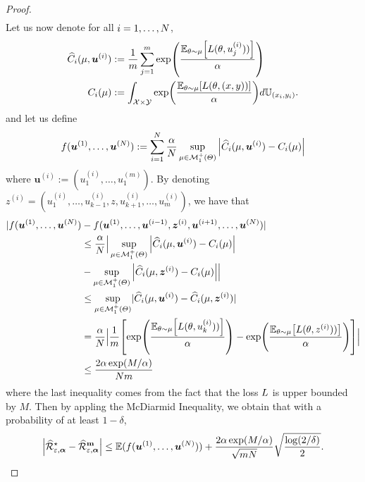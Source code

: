 \begin{proof}
\begin{align*}
\end{align*}
Let us now denote for all $i=1,\dots,N$,
\begin{align*}
    \widehat{C}_i(\mu,\bm{u}^{(i)})&:=\frac1m \sum_{j=1}^{m}\exp\left(\frac{\mathbb{E}_{\theta \sim \mu}\left[\loss(\theta,u_j^{(i)}))\right]}{\alpha}\right)\\
    C_i(\mu)&:= \int_{\mathcal{X}\times\mathcal{Y}}\exp\left(\frac{\mathbb{E}_{\theta \sim \mu}\left[\loss(\theta,(x,y))\right]}{\alpha}\right) d\mathbb{U}_{(x_i,y_i)}.
\end{align*}
and let us define 
\begin{align*}
    f(\bm{u}^{(1)},\dots,\bm{u}^{(N)}):=\sum_{i=1}^N\frac{\alpha}{N}\sup_{\mu\in \mathcal{M}^+_1(\Theta)}\Big |\widehat{C}_i(\mu,\bm{u}^{(i)}) -C_i(\mu)\Big |
\end{align*}
where $\bm{u}^{(i)}:=(u_1^{(i)},\dots,u_1^{(m)})$. By denoting $z^{(i)}=(u_1^{(i)},\dots,u_{k-1}^{(i)},z,u_{k+1}^{(i)},\dots,u_m^{(i)})$, we have that
\begin{align*}
  |f(\bm{u}^{(1)},\dots,\bm{u}^{(\numsamples)})& - f(\bm{u}^{(1)},\dots,\bm{u}^{(i-1)},\bm{z}^{(i)},\bm{u}^{(i+1)},\dots,\bm{u}^{(\numsamples)})|\\
  &\leq \frac{\alpha}{\numsamples}\Big | \sup_{\mu\in \mathcal{M}^+_1(\Theta)}\Big |\widehat{C}_i(\mu,\bm{u}^{(i)}) -C_i(\mu)\Big |\\
 & - \sup_{\mu\in \mathcal{M}^+_1(\Theta)}\Big |\widehat{C}_i(\mu,\bm{z}^{(i)}) -C_i(\mu)\Big | \Big |\\
 &\leq\sup_{\mu\in \mathcal{M}^+_1(\Theta)} \lvert \widehat{C}_i(\mu,\bm{u}^{(i)}) -\widehat{C}_i(\mu,\bm{z}^{(i)}) \rvert\\
  &= \frac{\alpha}{\numsamples}\Big |\frac{1}{m}\left[\exp\left(\frac{\mathbb{E}_{\theta \sim \mu}\left[\loss(\theta,u_k^{(i)}))\right]}{\alpha}\right) - \exp\left(\frac{\mathbb{E}_{\theta \sim \mu}\left[\loss(\theta,z^{(i)}))\right]}{\alpha}\right) \right]\Big| \\
  &\leq \frac{2\alpha\exp(M/\alpha)}{\numsamples m}
\end{align*}
where the last inequality comes from the fact that the loss  $L$ is upper bounded by $M$. Then by appling the McDiarmid Inequality, we obtain that with a probability of at least $1-\delta$,
\begin{align*}
 \Big| \widehat{\mathcal{R}}^{\star}_{\varepsilon,\bm{\alpha}} - \widehat{\mathcal{R}}^{\textbf{m}}_{\varepsilon,\bm{\alpha}}\Big |\leq\mathbb{E}(f(\bm{u}^{(1)},\dots,\bm{u}^{(\numsamples)}))+\frac{2\alpha\exp(M/\alpha)}{\sqrt{m\numsamples}}\sqrt{\frac{\log(2/\delta)}{2}}.

\end{align*}
\end{proof}
